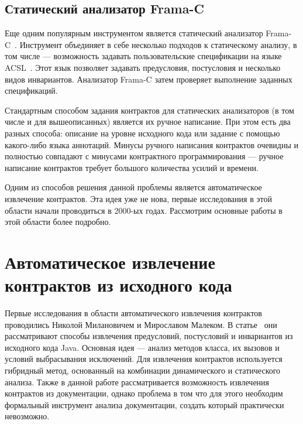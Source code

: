\subsection{Статический анализатор Frama-C}
Еще одним популярным инструментом является статический анализатор Frama-C~\cite{framaC}. Инструмент объединяет в себе несколько подходов к статическому анализу, в том числе --- возможность задавать пользовательские спецификации на языке ACSL~\cite{acsl}. Этот язык позволяет задавать предусловия, постусловия и несколько видов инвариантов. Анализатор Frama-C затем проверяет выполнение заданных спецификаций.


Стандартным способом задания контрактов для статических анализаторов (в том числе и для вышеописанных) является их ручное написание. При этом есть два разных способа: описание на уровне исходного кода или задание с помощью какого-либо языка аннотаций. Минусы ручного написания контрактов очевидны и полностью совпадают с минусами контрактного программирования --- ручное написание контрактов требует большого количества усилий и времени.

Одним из способов решения данной проблемы является автоматическое извлечение контрактов. Эта идея уже не нова, первые исследования в этой области начали проводиться в 2000-ых годах. Рассмотрим основные работы в этой области более подробно.

\section{Автоматическое извлечение контрактов из исходного кода}
Первые исследования в области автоматического извлечения контрактов проводились Николой Милановичем и Мирославом Малеком. В статье~\cite{extractingContractsFromJava} они рассматривают способы извлечения предусловий, постусловий и инвариантов из исходного кода Java. Основная идея --- анализ методов класса, их вызовов и условий выбрасывания исключений. Для извлечения контрактов используется гибридный метод, основанный на комбинации динамического и статического анализа. Также в данной работе рассматривается возможность извлечения контрактов из документации, однако проблема в том что для этого необходим формальный инструмент анализа документации, создать который практически невозможно.

